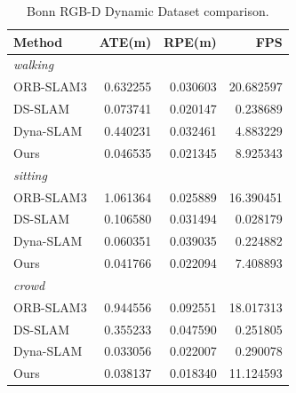 \begin{table}[t]
\centering
\caption{Bonn RGB-D Dynamic Dataset comparison.}
\label{tab:bonn_dynamic_comparison}
\begin{tabular}{lrrr}
\toprule
Method & ATE(m) & RPE(m) & FPS \\
\midrule
\multicolumn{4}{l}{\textit{walking}} \\
ORB-SLAM3 & 0.632255 & 0.030603 & 20.682597 \\
DS-SLAM & 0.073741 & 0.020147 & 0.238689 \\
Dyna-SLAM & 0.440231 & 0.032461 & 4.883229 \\
Ours & 0.046535 & 0.021345 & 8.925343 \\
\multicolumn{4}{l}{\textit{sitting}} \\
ORB-SLAM3 & 1.061364 & 0.025889 & 16.390451 \\
DS-SLAM & 0.106580 & 0.031494 & 0.028179 \\
Dyna-SLAM & 0.060351 & 0.039035 & 0.224882 \\
Ours & 0.041766 & 0.022094 & 7.408893 \\
\multicolumn{4}{l}{\textit{crowd}} \\
ORB-SLAM3 & 0.944556 & 0.092551 & 18.017313 \\
DS-SLAM & 0.355233 & 0.047590 & 0.251805 \\
Dyna-SLAM & 0.033056 & 0.022007 & 0.290078 \\
Ours & 0.038137 & 0.018340 & 11.124593 \\
\bottomrule
\end{tabular}
\end{table}
